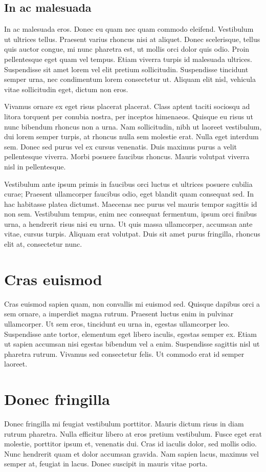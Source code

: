 \documentclass[sigconf]{acmart}
\begin{document}
\subsection{In ac malesuada}
In ac malesuada eros. Donec eu quam nec quam commodo eleifend. Vestibulum ut ultrices tellus. Praesent varius rhoncus nisi at aliquet. Donec scelerisque, tellus quis auctor congue, mi nunc pharetra est, ut mollis orci dolor quis odio. Proin pellentesque eget quam vel tempus. Etiam viverra turpis id malesuada ultrices. Suspendisse sit amet lorem vel elit pretium sollicitudin. Suspendisse tincidunt semper urna, nec condimentum lorem consectetur ut. Aliquam elit nisl, vehicula vitae sollicitudin eget, dictum non eros.

Vivamus ornare ex eget risus placerat placerat. Class aptent taciti sociosqu ad litora torquent per conubia nostra, per inceptos himenaeos. Quisque eu risus ut nunc bibendum rhoncus non a urna. Nam sollicitudin, nibh ut laoreet vestibulum, dui lorem semper turpis, at rhoncus nulla sem molestie erat. Nulla eget interdum sem. Donec sed purus vel ex cursus venenatis. Duis maximus purus a velit pellentesque viverra. Morbi posuere faucibus rhoncus. Mauris volutpat viverra nisl in pellentesque.

Vestibulum ante ipsum primis in faucibus orci luctus et ultrices posuere cubilia curae; Praesent ullamcorper faucibus odio, eget blandit quam consequat sed. In hac habitasse platea dictumst. Maecenas nec purus vel mauris tempor sagittis id non sem. Vestibulum tempus, enim nec consequat fermentum, ipsum orci finibus urna, a hendrerit risus nisi eu urna. Ut quis massa ullamcorper, accumsan ante vitae, cursus turpis. Aliquam erat volutpat. Duis sit amet purus fringilla, rhoncus elit at, consectetur nunc.

\section{Cras euismod}
Cras euismod sapien quam, non convallis mi euismod sed. Quisque dapibus orci a sem ornare, a imperdiet magna rutrum. Praesent luctus enim in pulvinar ullamcorper. Ut sem eros, tincidunt eu urna in, egestas ullamcorper leo. Suspendisse ante tortor, elementum eget libero iaculis, egestas semper ex. Etiam ut sapien accumsan nisi egestas bibendum vel a enim. Suspendisse sagittis nisl ut pharetra rutrum. Vivamus sed consectetur felis. Ut commodo erat id semper laoreet.

\section{Donec fringilla}
Donec fringilla mi feugiat vestibulum porttitor. Mauris dictum risus in diam rutrum pharetra. Nulla efficitur libero at eros pretium vestibulum. Fusce eget erat molestie, porttitor ipsum et, venenatis dui. Cras id iaculis dolor, sed mollis odio. Nunc hendrerit quam et dolor accumsan gravida. Nam sapien lacus, maximus vel semper at, feugiat in lacus. Donec suscipit in mauris vitae porta.
\end{document}
